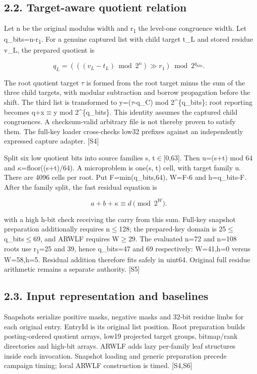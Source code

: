 \documentclass[10pt,letterpaper]{article}
\begin{document}
\subsection*{2.2. Target-aware quotient relation}

Let n be the original modulus width and r\textsubscript{1} the level-one congruence width. Let q\_bits=n-r\textsubscript{1}. For a genuine captured list with child target t\_L and stored residue v\_L, the prepared quotient is


\[
q_L=\left(\left((v_L-t_L)\bmod2^n\right)\mathbin{\gg}r_1\right)\bmod2^{q_{\mathrm{bits}}}.
\]

The root quotient target \ensuremath{\tau} is formed from the root target minus the sum of the three child targets, with modular subtraction and borrow propagation before the shift. The third list is transformed to y=(\ensuremath{\tau}-q\_C) mod 2\textasciicircum{}\{q\_bits\}; root reporting becomes q+x\ensuremath{\equiv}y mod 2\textasciicircum{}\{q\_bits\}. This identity assumes the captured child congruences. A checksum-valid arbitrary file is not thereby proven to satisfy them. The full-key loader cross-checks low32 prefixes against an independently expressed capture adapter. [S4]


Split six low quotient bits into source families s, t\ensuremath{\in}[0,63]. Then u=(s+t) mod 64 and \ensuremath{\kappa}=floor((s+t)/64). A microproblem is one(s, t) cell, with target family u. There are 4096 cells per root. Put F=min(q\_bits,64), W=F-6 and h=q\_bits-F. After the family split, the fast residual equation is


\[
a+b+\kappa\equiv d\pmod{2^W}.
\]

with a high h-bit check receiving the carry from this sum. Full-key snapshot preparation additionally requires n\ensuremath{\leq}128; the prepared-key domain is 25\ensuremath{\leq}q\_bits\ensuremath{\leq}69, and ARWLF requires W\ensuremath{\geq}29. The evaluated n=72 and n=108 roots use r\textsubscript{1}=25 and 39, hence q\_bits=47 and 69 respectively: W=41,h=0 versus W=58,h=5. Residual addition therefore fits safely in uint64. Original full residue arithmetic remains a separate authority. [S5]


\subsection*{2.3. Input representation and baselines}

Snapshots serialize positive masks, negative masks and 32-bit residue limbs for each original entry. EntryId is its original list position. Root preparation builds posting-ordered quotient arrays, low19 projected target groups, bitmap/rank directories and high-bit arrays. ARWLF adds lazy per-family leaf structures inside each invocation. Snapshot loading and generic preparation precede campaign timing; local ARWLF construction is timed. [S4,S6]
\end{document}
